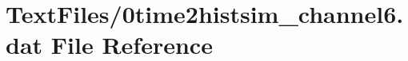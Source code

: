 \hypertarget{0time2histsim__channel6_8dat}{}\section{Text\+Files/0time2histsim\+\_\+channel6.dat File Reference}
\label{0time2histsim__channel6_8dat}

